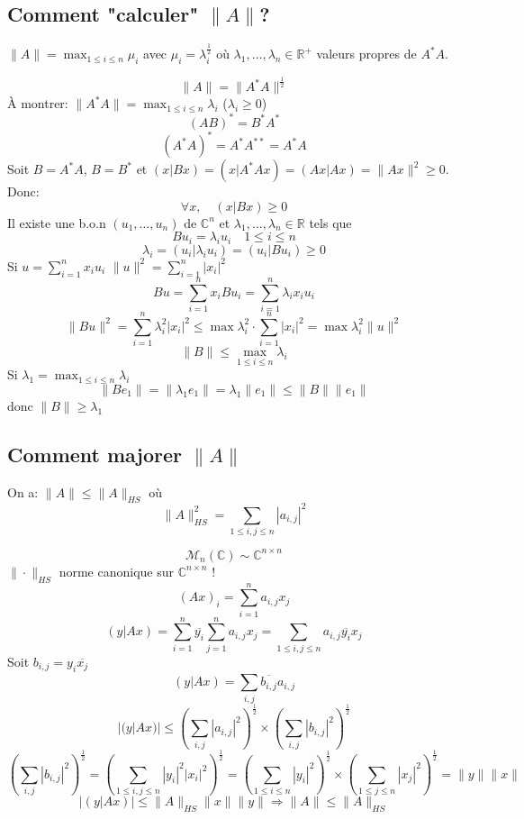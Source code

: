 \documentclass[a4paper]{report}
\newcommand\R{\ensuremath{\mathbb{R}}}
\let\implies\Rightarrow
\theoremstyle{definition}
\begin{document}
 \subsection{Comment "calculer" $\|A\|$?}
 \begin{theorem}
     $\|A\| = \max_{1 \le i \le n} \mu_i$ avec $\mu_i = \lambda_i^{\frac{1}{2}}$ où $\lambda_1, \ldots, \lambda_n \in \R^+$ valeurs propres de $A^*A$.
 \end{theorem}
 \begin{preuve}
    \[
        \|A\| = \|A^*A\|^{\frac{1}{2}}
    \]  
    À montrer: $\|A^*A\| = \max_{1 \le i \le n} \lambda_i$ ($\lambda_i \ge 0$)
    \[
        (AB)^* = B^*A^*
    \] 
    \[
        (A^*A)^* = A^*A^{* *} = A^*A
    \] 
    Soit $B = A^*A$,  $B = B^*$ et  $(x|Bx) = (x|A^*Ax) = (Ax|Ax) = \|Ax\|^2 \ge 0$. Donc:
    \[
    \forall x, \quad (x|Bx) \ge 0
    \] 
    Il existe une b.o.n $(u_1, \ldots, u_n)$ de $\mathbb{C}^n$ et  $\lambda_1, \ldots, \lambda_n \in \R$ tels que 
    \[
    Bu_i = \lambda_iu_i \quad 1\le i \le n
    \] 
    \[
        \lambda_i = (u_i|\lambda_iu_i) = (u_i|Bu_i) \ge 0 
    \] 
    Si $u = \sum_{i=1}^{n} x_iu_i$ $\|u\|^2 = \sum_{i=1}^{n} |x_i|^2$ 
    \[
    Bu = \sum_{i=1}^{n} x_iBu_i = \sum_{i=1}^{n} \lambda_ix_iu_i
    \] 
    \[
    \|Bu\|^2 = \sum_{i=1}^{n} \lambda_i^2|x_i|^2 \le \max \lambda_i^2 \cdot \sum_{i=1}^{n} |x_i|^2 = \max \lambda_i^2 \|u\|^2
    \] 
    \[
    \|B\| \le \max_{1 \le i \le n} \lambda_i
    \] 
    Si $\lambda_1 = \max_{1 \le i \le n} \lambda_i$
    \[
    \|Be_1\| = \|\lambda_1e_1\| = \lambda_1\|e_1\| \le \|B\|\|e_1\|
    \] 
    donc $\|B\| \ge \lambda_1$
 \end{preuve}
 \subsection{Comment majorer $\|A\|$}
 \begin{prop}
    On a: $\|A\| \le \|A\|_{HS}$ où
    \[
    \|A\|_{HS}^2 = \sum_{1\le i,j\le n}^{} |a_{i,j}|^2
    \] 
 \end{prop}
 \begin{preuve}
     
    \[
        \mathcal{M}_n(\mathbb{C}) \sim \mathbb{C}^{n \times n}
    \] 
    $\| \cdot \|_{HS}$ norme canonique sur $\mathbb{C}^{n \times n}$ !
    \[
        (Ax)_{i} = \sum_{i=1}^{n} a_{i, j}x_j
    \] 
    \[
        (y|Ax) = \sum_{i=1}^{n} \overline{y_i}\sum_{j=1}^{n} a_{i,j}x_j = \sum_{1 \le i,j \le n}^{} a_{i, j}\overline{y_i}x_{j}
    \] 
    Soit $b_{i, j} = y_i \overline{x_j}$ 
    \[
        (y|Ax) = \sum_{i,j}^{} \overline{b_{i,j}}a_{i,j}
    \] 
    \[
        |(y|Ax)| \le \left( \sum_{i,j}^{} |a_{i,j}|^2 \right)^{\frac{1}{2}} \times \left( \sum_{i,j}^{} |b_{i,j}|^2 \right)^{\frac{1}{2}}
    \] 
    \[
        \left( \sum_{i,j}^{} |b_{i,j}|^2 \right)^{\frac{1}{2}} = \left( \sum_{1\le i,j \le n}^{} |y_i|^2 |x_i|^2 \right)^{\frac{1}{2}} = \left( \sum_{1\le i \le n}^{} |y_i|^2 \right)^{\frac{1}{2}} \times \left( \sum_{1 \le j \le n}^{} |x_j|^2 \right)^{\frac{1}{2}} = \|y\| \|x\|
    \] 
    \[
    \left| (y|Ax) \right| \le \|A\|_{HS} \|x\| \|y\| \implies \|A\| \le \|A\|_{HS}
    \] 
 \end{preuve}
\end{document}
